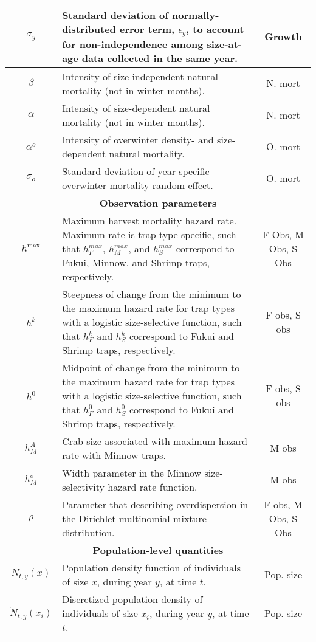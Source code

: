 \documentclass{article}
\begin{document}
\begin{longtable}{||c p{9cm} c||}
 \hline
 $\sigma_y$ & Standard deviation of normally-distributed error term, $\epsilon_y$, to account for non-independence among size-at-age data collected in the same year. & Growth \\ 
 \hline
 $\beta$ & Intensity of size-independent natural mortality (not in winter months). & N. mort \\ 
 \hline
 $\alpha$ & Intensity of size-dependent natural mortality (not in winter months). & N. mort \\ 
 \hline
 $\alpha^o$ & Intensity of overwinter density- and size-dependent natural mortality. & O. mort \\ 
 \hline
 \hline
 $\sigma_o$ & Standard deviation of year-specific overwinter mortality random effect. & O. mort \\ 
 \hline\hline
 \multicolumn{3}{||c||}{\textbf{Observation parameters}} \\ 
 \hline
 $h^{\text{max}}$ & Maximum harvest mortality hazard rate. Maximum rate is trap type-specific, such that $h_F^{max}$, $h_M^{max}$, and $h_S^{max}$ correspond to Fukui, Minnow, and Shrimp traps, respectively. & F Obs, M Obs, S Obs \\ 
 \hline
 $h^{k}$ & Steepness of change from the minimum to the maximum hazard rate for trap types with a logistic size-selective function, such that $h_F^{k}$ and $h_S^{k}$ correspond to Fukui and Shrimp traps, respectively. & F obs, S obs \\ 
 \hline
 $h^{0}$ & Midpoint of change from the minimum to the maximum hazard rate for trap types with a logistic size-selective function, such that $h_F^{0}$ and $h_S^{0}$ correspond to Fukui and Shrimp traps, respectively. & F obs, S obs \\ 
 \hline
 $h_M^{A}$ & Crab size associated with maximum hazard rate with Minnow traps. & M obs \\ 
 \hline
 $h_M^{\sigma}$ & Width parameter in the Minnow size-selectivity hazard rate function. & M obs \\ 
 \hline
 $\rho$ & Parameter that describing overdispersion in the Dirichlet-multinomial mixture distribution. & F obs, M Obs, S Obs \\
 \hline\hline
 \multicolumn{3}{||c||}{\textbf{Population-level quantities}} \\ 
 \hline
 $N_{t,y}(x)$ & Population density function of individuals of size $x$, during year $y$, at time $t$. & Pop. size \\ 
 \hline
 $\tilde{N}_{t,y}(x_i)$ & Discretized population density of individuals of size $x_i$, during year $y$, at time $t$. & Pop. size \\ 

\end{longtable}
\end{document}
